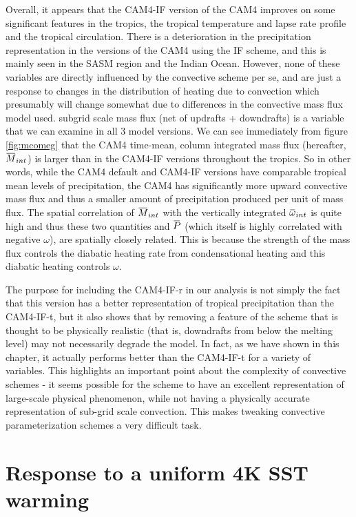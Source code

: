 \documentclass[letterpaper,12pt,titlepage,oneside,final]{book}
\newcommand{\overbar}[1]{\mkern 1.5mu\overline{\mkern-1.5mu#1\mkern-1.5mu}\mkern 1.5mu}
\begin{document}
Overall, it appears that the CAM4-IF version of the CAM4 improves on some significant features in the tropics, the tropical temperature and lapse rate profile and the tropical circulation. There is a deterioration in the precipitation representation in the versions of the CAM4 using the IF scheme, and this is mainly seen in the SASM region and the Indian Ocean. However, none of these variables are directly influenced by the convective scheme per se, and are just a response to changes in the distribution of heating due to convection which presumably will change somewhat due to differences in the convective mass flux model used. subgrid scale mass flux (net of updrafts + downdrafts) is a variable that we can examine in all 3 model versions. We can see immediately from figure \ref{fig:mcomeg} that the CAM4 time-mean, column integrated mass flux (hereafter, $\overbar{M}_{int}$) is larger than in the CAM4-IF versions throughout the tropics.  So in other words, while the CAM4 default and CAM4-IF versions have comparable tropical mean levels of precipitation, the CAM4 has significantly more upward convective mass flux and thus a smaller amount of precipitation produced per unit of mass flux. The spatial correlation of $\overbar{M}_{int}$ with the vertically integrated $\overbar{\omega}_{int}$ is quite high and thus these two quantities and $\overbar{P}$ (which itself is highly correlated with negative $\omega$), are spatially closely related. This is because the strength of the mass flux controls the diabatic heating rate from condensational heating and this diabatic heating controls $\omega$. 

The purpose for including the CAM4-IF-r in our analysis is not simply the fact that this version has a better representation of tropical precipitation than the CAM4-IF-t, but it also shows that by removing a feature of the scheme that is thought to be physically realistic (that is, downdrafts from below the melting level) may not necessarily degrade the model. In fact, as we have shown in this chapter, it actually performs better than the CAM4-IF-t for a variety of variables. This highlights an important point about the complexity of convective schemes - it seems possible for the scheme to have an excellent representation of large-scale physical phenomenon, while not having a physically accurate representation of sub-grid scale convection. This makes tweaking convective parameterization schemes a very difficult task.

\section{Response to a uniform 4K SST warming}
\end{document}
